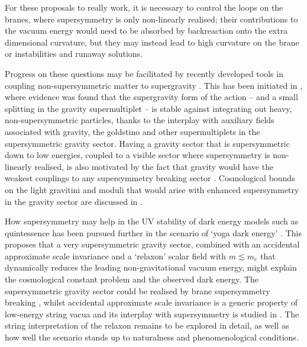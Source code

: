 For these proposals to really work, it is necessary to control the loops on the branes, where supersymmetry is only non-linearly realised; their contributions to the vacuum energy would need to be absorbed by backreaction onto the extra dimensional curvature, but they may instead lead to high curvature on the brane or instabilities and runaway solutions.  

Progress on these questions may be facilitated by recently developed tools in coupling non-supersymmetric matter to supergravity \cite{Komargodski:2009rz, Bergshoeff:2015tra, Dudas:2015eha, DallAgata:2015zxp, Schillo:2015ssx, Parameswaran:2020ukp}. This has been initiated in \cite{Burgess:2021juk}, where evidence was found that the supergravity form of the action -- and a small splitting in the gravity supermultiplet --  is stable against integrating out heavy, non-supersymmetric particles, thanks to the interplay with auxiliary fields associated with gravity, the goldstino and other supermultiplets in the supersymmetric gravity sector.  Having a gravity sector that is supersymmetric down to low energies, coupled to a visible sector where supersymmetry is non-linearly realised, is also motivated by the fact that gravity would have the weakest couplings to any supersymmetry breaking sector \cite{Arkani-Hamed:2006emk}. Cosmological bounds on the light gravitini and moduli that would arise with enhanced supersymmetry in the gravity sector are discussed in \cite{Kawasaki:2008qe, Feng:2010gw, Coughlan:1983ci, Banks:1993en, deCarlos:1993wie, Conlon:2007gk}.

How supersymmetry may help in the UV stability of dark energy models such as quintessence has been pursued further in the scenario of `yoga dark energy' \cite{Burgess:2021obw}. This proposes that a very supersymmetric gravity sector, combined with an accidental approximate scale invariance  and a `relaxon' scalar field \cite{Graham:2019bfu} with $m \lesssim m_e$ that dynamically reduces the leading non-gravitational vacuum energy, might explain the cosmological constant problem and the observed dark energy.  The supersymmetric gravity sector could be realised by brane supersymmetry breaking \cite{Sugimoto:1999tx, Dudas:2000nv, Antoniadis:1999xk, Kallosh:2014wsa, Kallosh:2016aep, GarciadelMoral:2017vnz, Cribiori:2019hod}, whilst accidental approximate scale invariance is a generic property of low-energy string vacua \cite{Berg:2005ja, Cicoli:2007xp, Cicoli:2021rub} and its interplay with supersymmetry is studied in \cite{Burgess:2020qsc}. The string interpretation of the relaxon remains to be explored in detail, as well as how well the scenario stands up to naturalness and phenomenological conditions.  

